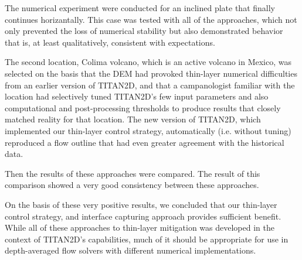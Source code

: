 \documentclass[letterpaper,10pt]{article}
\begin{document}
The numerical experiment were conducted for an inclined plate that finally continues horizantally. 
This case was tested with all of the approaches,
which not only prevented the 
loss of numerical stability but also demonstrated behavior that
is, at least qualitatively, consistent with expectations.

The second location, Colima volcano, which is an active volcano 
in Mexico, was selected on the basis that the DEM had provoked 
thin-layer numerical difficulties from an earlier version of TITAN2D, 
and that a campanologist familiar with the location had selectively 
tuned TITAN2D's few input parameters and also computational and 
post-processing thresholds to produce results that closely matched 
reality for that location. The new version of TITAN2D, which implemented
our thin-layer control strategy, automatically (i.e. without 
tuning) reproduced a flow outline that had even greater agreement 
with the historical data. 

Then the results of these approaches were compared. The result of this comparison showed 
a very good consistency between these approaches.

On the basis of these very positive results, we concluded that our 
thin-layer control strategy, and interface capturing approach provides sufficient benefit. 
While all of these approaches to thin-layer mitigation was developed in the 
context of TITAN2D's capabilities, much of it should be appropriate 
for use in depth-averaged flow solvers with different numerical 
implementations.



\end{document}
